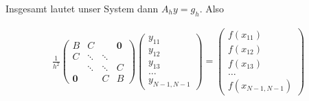 \begin{solution}
   Insgesamt lautet unser System dann $A_h y = g_h$. Also

   \begin{align*}
   \frac{1}{h^2}\left(\begin{array}{cccccc}
               B & C && \boldsymbol{0} \\
               C & \ddots & \ddots & \\
               & \ddots & \ddots & C \\
               \boldsymbol{0} && C & B
          \end{array}
    \right) \left(\begin{array}{c}
    y_{11} \\
    y_{12} \\
    y_{13} \\
    \hdots \\
    y_{N-1,N-1}
    \end{array}
    \right)
    =
    \left(\begin{array}{c}
    f(x_{11}) \\
    f(x_{12}) \\
    f(x_{13}) \\
    \hdots \\
    f(x_{N-1,N-1})
    \end{array}
    \right)
   \end{align*}
\end{solution}
